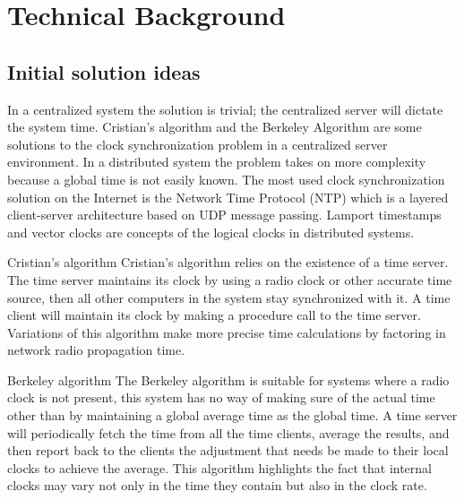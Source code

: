 \chapter{Technical Background}
\label{chap:technical}
%
%
%

\section{Initial solution ideas}
In a centralized system the solution is trivial; the centralized server will
dictate the system time. Cristian's algorithm and the Berkeley Algorithm are
some solutions to the clock synchronization problem in a centralized server
environment. In a distributed system the problem takes on more complexity because
a global time is not easily known. The most used clock synchronization solution on
the Internet is the Network Time Protocol (NTP) which is a layered client-server
architecture based on UDP message passing. Lamport timestamps and vector clocks
are concepts of the logical clocks in distributed systems.

Cristian's algorithm
Cristian's algorithm relies on the existence of a time server. The time
server maintains its clock by using a radio clock or other accurate time source,
then all other computers in the system stay synchronized with it. A time client
will maintain its clock by making a procedure call to the time server. Variations
of this algorithm make more precise time calculations by factoring in network radio
propagation time.

Berkeley algorithm
The Berkeley algorithm is suitable for systems where a radio clock is not present,
this system has no way of making sure of the actual time other than by maintaining
a global average time as the global time. A time server will periodically fetch
the time from all the time clients, average the results, and then report back to
the clients the adjustment that needs be made to their local clocks to achieve
the average. This algorithm highlights the fact that internal clocks may vary
not only in the time they contain but also in the clock rate.

